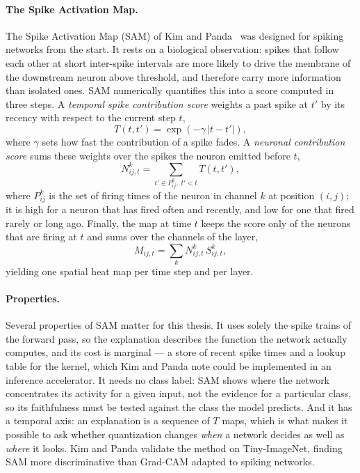 \paragraph{The Spike Activation Map.} The Spike Activation Map (SAM) of Kim and
Panda~\cite{kim2021sam} was designed for spiking networks from the start. It
rests on a biological observation: spikes that follow each other at short
inter-spike intervals are more likely to drive the membrane of the downstream
neuron above threshold, and therefore carry more information than isolated
ones. SAM numerically quantifies this into a score computed in three steps. A \emph{temporal
spike contribution score} weights a past spike at $t'$ by its recency with
respect to the current step $t$,
\begin{equation}
T(t, t') = \exp\left(-\gamma\,|t - t'|\right),
\label{eq:tscs}
\end{equation}
where $\gamma$ sets how fast the contribution of a spike fades. A
\emph{neuronal contribution score} sums these weights over the spikes the neuron
emitted before $t$,
\begin{equation}
N^{k}_{ij,t} = \sum_{t' \in P^{k}_{ij},\; t' < t} T(t, t'),
\label{eq:ncs}
\end{equation}
where $P^{k}_{ij}$ is the set of firing times of the neuron in channel $k$ at
position $(i,j)$; it is high for a neuron that has fired often and recently, and
low for one that fired rarely or long ago. Finally, the map at time $t$ keeps
the score only of the neurons that are firing at $t$ and sums over the channels
of the layer,
\begin{equation}
M_{ij,t} = \sum_{k} N^{k}_{ij,t}\, S^{k}_{ij,t},
\label{eq:sam}
\end{equation}
yielding one spatial heat map per time step and per layer.

\paragraph{Properties.} Several properties of SAM matter for this thesis. It uses
solely the spike trains of the forward pass, so the explanation describes the function the
network actually computes, and its cost is marginal --- a store of recent spike
times and a lookup table for the kernel, which Kim and Panda note could be
implemented in an inference accelerator. It needs no class label: SAM shows
where the network concentrates its activity for a given input, not the evidence
for a particular class, so its faithfulness must be tested against the class
the model predicts. And it has a temporal axis: an explanation is a sequence of
$T$ maps, which is what makes it possible to ask whether quantization changes
\emph{when} a network decides as well as \emph{where} it looks. Kim and Panda
validate the method on Tiny-ImageNet, finding SAM more discriminative than
Grad-CAM adapted to spiking networks.

